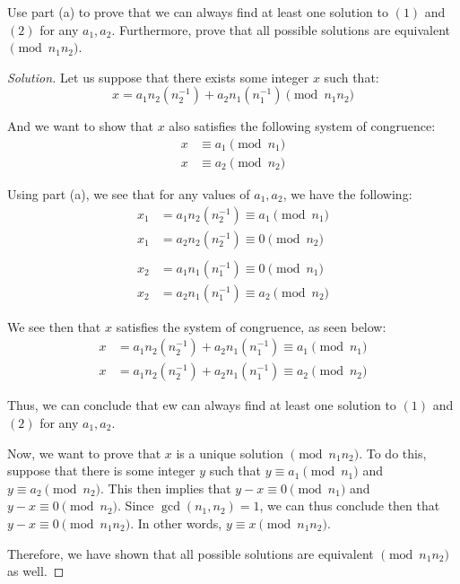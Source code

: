 \documentclass{article}
\newenvironment{solution}{\begin{proof}[Solution]}{\end{proof}}
\begin{document}
\begin{hw}
	Use part (a) to prove that we can always find at least one solution to $(1)$ and $(2)$ for any $a_1,a_2$. Furthermore, prove that all possible solutions are equivalent
	$\pmod{n_1n_2}$.
\end{hw}
\begin{solution}
	Let us suppose that there exists some integer $x$ such that:
	\begin{equation*}
		x = a_{1}n_{2}(n^{-1}_{2}) + a_{2}n_{1}(n_{1}^{-1}) \pmod{n_{1}n_{2}}
	\end{equation*}
	
	And we want to show that $x$ also satisfies the following system of congruence:
	\begin{align*}
		x &\equiv a_{1} \pmod{n_{1}} \\
		x &\equiv a_{2} \pmod{n_{2}}
	\end{align*}
	
	Using part (a), we see that for any values of $a_{1}, a_{2}$, we have the following:
	\begin{align*}
		x_{1} &= a_{1}n_{2}(n^{-1}_{2}) \equiv a_{1} \pmod{n_{1}} \\
		x_{1} &= a_{2}n_{2}(n_{2}^{-1}) \equiv 0 \pmod{n_{2}} \\
		\\
		x_{2} &= a_{1}n_{1}(n_{1}^{-1}) \equiv 0 \pmod{n_{1}} \\
		x_{2} &= a_{2}n_{1}(n_{1}^{-1}) \equiv a_{2} \pmod{n_{2}}
	\end{align*}
	
	We see then that $x$ satisfies the system of congruence, as seen below:
	\begin{align*}
		x &= a_{1}n_{2}(n^{-1}_{2}) + a_{2}n_{1}(n_{1}^{-1}) \equiv a_{1} \pmod{n_{1}} \\
		x &= a_{1}n_{2}(n^{-1}_{2}) + a_{2}n_{1}(n_{1}^{-1}) \equiv a_{2} \pmod{n_{2}}
	\end{align*}

	Thus, we can conclude that ew can always find at least one solution to $(1)$ and $(2)$ for any $a_{1}, a_{2}$.
	
	Now, we want to prove that $x$ is a unique solution $\pmod{n_{1}n_{2}}$. To do this, suppose that there is some integer $y$ such that $y \equiv a_{1} \pmod{n_{1}}$ and $y \equiv a_{2} \pmod{n_{2}}$. This then implies that $y - x \equiv 0 \pmod{n_{1}}$ and $y - x \equiv 0 \pmod{n_{2}}$. Since $\gcd(n_{1}, n_{2}) = 1$, we can thus conclude then that $y - x \equiv 0 \pmod{n_{1}n_{2}}$. In other words, $y \equiv x \pmod{n_{1}n_{2}}$.
	
	Therefore, we have shown that all possible solutions are equivalent $\pmod{n_{1}n_{2}}$ as well.

\end{solution}
\end{document}
